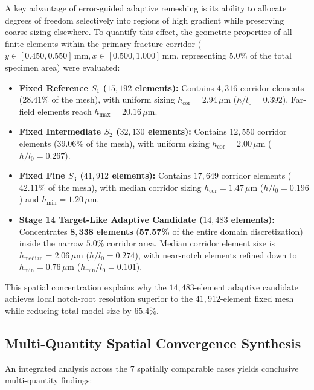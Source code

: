 A key advantage of error-guided adaptive remeshing is its ability to allocate degrees of freedom selectively into regions of high gradient while preserving coarse sizing elsewhere. To quantify this effect, the geometric properties of all finite elements within the primary fracture corridor ($y \in [0.450, 0.550]\,\mathrm{mm}, x \in [0.500, 1.000]\,\mathrm{mm}$, representing $5.0\%$ of the total specimen area) were evaluated:
\begin{itemize}
    \item \textbf{Fixed Reference $S_1$ ($15,192$ elements):} Contains $4,316$ corridor elements ($28.41\%$ of the mesh), with uniform sizing $h_{\mathrm{cor}} = 2.94\,\mu\mathrm{m}$ ($h/l_0 = 0.392$). Far-field elements reach $h_{\max} = 20.16\,\mu\mathrm{m}$.
    \item \textbf{Fixed Intermediate $S_2$ ($32,130$ elements):} Contains $12,550$ corridor elements ($39.06\%$ of the mesh), with uniform sizing $h_{\mathrm{cor}} = 2.00\,\mu\mathrm{m}$ ($h/l_0 = 0.267$).
    \item \textbf{Fixed Fine $S_3$ ($41,912$ elements):} Contains $17,649$ corridor elements ($42.11\%$ of the mesh), with median corridor sizing $h_{\mathrm{cor}} = 1.47\,\mu\mathrm{m}$ ($h/l_0 = 0.196$) and $h_{\min} = 1.20\,\mu\mathrm{m}$.
    \item \textbf{Stage 14 Target-Like Adaptive Candidate ($14,483$ elements):} Concentrates $\mathbf{8,338}$ \textbf{elements} (\textbf{57.57\%} of the entire domain discretization) inside the narrow $5.0\%$ corridor area. Median corridor element size is $h_{\mathrm{median}} = 2.06\,\mu\mathrm{m}$ ($h/l_0 = 0.274$), with near-notch elements refined down to $h_{\min} = 0.76\,\mu\mathrm{m}$ ($h_{\min}/l_0 = 0.101$).
\end{itemize}
This spatial concentration explains why the $14,483$-element adaptive candidate achieves local notch-root resolution superior to the $41,912$-element fixed mesh while reducing total model size by $65.4\%$.

\subsection{Multi-Quantity Spatial Convergence Synthesis}
\label{subsec:stage14ut_synthesis}

An integrated analysis across the 7 spatially comparable cases yields conclusive multi-quantity findings:

